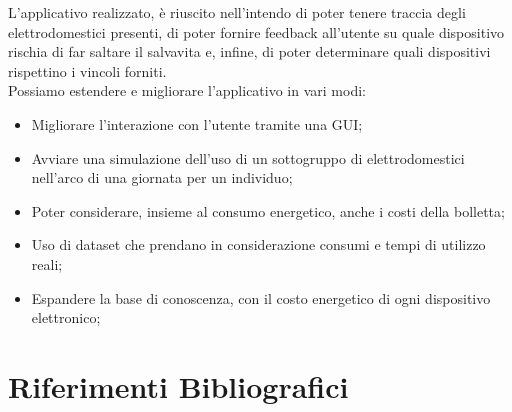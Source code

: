 \documentclass[12pt, letterpaper]{article}
\begin{document}
L'applicativo realizzato, è riuscito nell'intendo di poter tenere traccia degli elettrodomestici
presenti, di poter fornire feedback all'utente su quale dispositivo rischia di far saltare il salvavita
e, infine, di poter determinare quali dispositivi rispettino i vincoli forniti. \\

\noindent Possiamo estendere e migliorare l'applicativo in vari modi:
\begin{itemize}
      \item Migliorare l'interazione con l'utente tramite una GUI;
      \item Avviare una simulazione dell'uso di un sottogruppo di elettrodomestici
            nell'arco di una giornata per un individuo;
      \item Poter considerare, insieme al consumo energetico, anche i costi della bolletta;
      \item Uso di dataset che prendano in considerazione consumi e tempi di utilizzo reali;
      \item Espandere la base di conoscenza, con il costo energetico di ogni dispositivo elettronico;
\end{itemize}

\section{Riferimenti Bibliografici}
\end{document}
